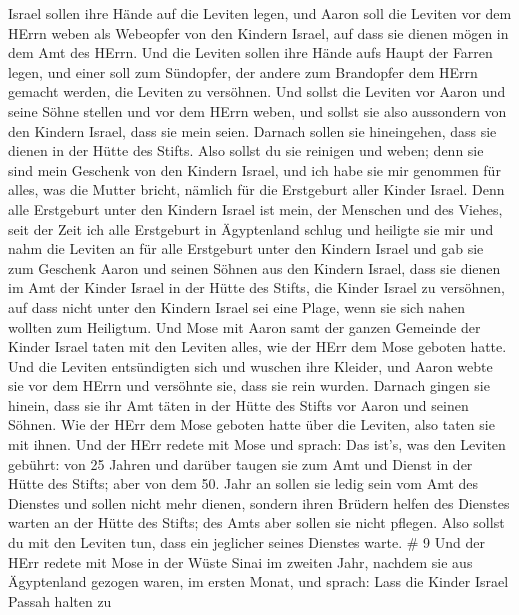 Israel sollen ihre Hände auf die Leviten legen,  und Aaron
soll die Leviten vor dem HErrn weben als Webeopfer von den Kindern
Israel, auf dass sie dienen mögen in dem Amt des HErrn. 
Und die Leviten sollen ihre Hände aufs Haupt der Farren legen, und einer
soll zum Sündopfer, der andere zum Brandopfer dem HErrn gemacht werden,
die Leviten zu versöhnen.  Und sollst die Leviten vor Aaron
und seine Söhne stellen und vor dem HErrn weben,  und
sollst sie also aussondern von den Kindern Israel, dass sie mein seien.
 Darnach sollen sie hineingehen, dass sie dienen in der
Hütte des Stifts. Also sollst du sie reinigen und weben; 
denn sie sind mein Geschenk von den Kindern Israel, und ich habe sie mir
genommen für alles, was die Mutter bricht, nämlich für die Erstgeburt
aller Kinder Israel.  Denn alle Erstgeburt unter den
Kindern Israel ist mein, der Menschen und des Viehes, seit der Zeit ich
alle Erstgeburt in Ägyptenland schlug und heiligte sie mir 
und nahm die Leviten an für alle Erstgeburt unter den Kindern Israel
 und gab sie zum Geschenk Aaron und seinen Söhnen aus den
Kindern Israel, dass sie dienen im Amt der Kinder Israel in der Hütte
des Stifts, die Kinder Israel zu versöhnen, auf dass nicht unter den
Kindern Israel sei eine Plage, wenn sie sich nahen wollten zum
Heiligtum.  Und Mose mit Aaron samt der ganzen Gemeinde der
Kinder Israel taten mit den Leviten alles, wie der HErr dem Mose geboten
hatte.  Und die Leviten entsündigten sich und wuschen ihre
Kleider, und Aaron webte sie vor dem HErrn und versöhnte sie, dass sie
rein wurden.  Darnach gingen sie hinein, dass sie ihr Amt
täten in der Hütte des Stifts vor Aaron und seinen Söhnen. Wie der HErr
dem Mose geboten hatte über die Leviten, also taten sie mit ihnen.
 Und der HErr redete mit Mose und sprach:  Das
ist's, was den Leviten gebührt: von 25 Jahren und darüber taugen sie zum
Amt und Dienst in der Hütte des Stifts;  aber von dem 50.
Jahr an sollen sie ledig sein vom Amt des Dienstes und sollen nicht mehr
dienen,  sondern ihren Brüdern helfen des Dienstes warten
an der Hütte des Stifts; des Amts aber sollen sie nicht pflegen. Also
sollst du mit den Leviten tun, dass ein jeglicher seines Dienstes warte.
\# 9  Und der HErr redete mit Mose in der Wüste Sinai im
zweiten Jahr, nachdem sie aus Ägyptenland gezogen waren, im ersten
Monat, und sprach:  Lass die Kinder Israel Passah halten zu
